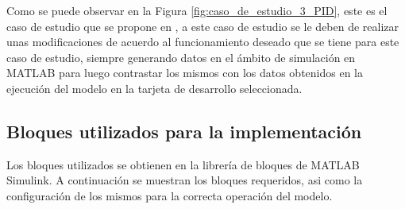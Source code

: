 Como se puede observar en la Figura \ref{fig:caso_de_estudio_3_PID}, este es el caso de estudio que se propone en \cite{microcontrollerslab_pid_controller_design}, a este caso de estudio se le deben de realizar unas modificaciones de acuerdo al funcionamiento deseado que se tiene para este caso de estudio, siempre generando datos en el ámbito de simulación en MATLAB para luego contrastar los mismos con los datos obtenidos en la ejecución del modelo en la tarjeta de desarrollo seleccionada.

\subsection{Bloques utilizados para la implementación}

Los bloques utilizados se obtienen en la librería de bloques de MATLAB Simulink. A continuación se muestran los bloques requeridos, asi como la configuración de los mismos para la correcta operación del modelo.

